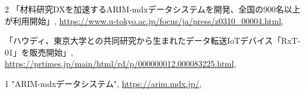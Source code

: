 \begin{発表}{2}
「材料研究DXを加速するARIM-mdxデータシステムを開発、全国の900名以上が利用開始」,
\url{https://www.u-tokyo.ac.jp/focus/ja/press/z0310_00004.html},

「ハウディ、東京大学との共同研究から生まれたデータ転送IoTデバイス「RxT-01」を販売開始」,
\url{https://prtimes.jp/main/html/rd/p/000000012.000083225.html},

\end{発表}

\begin{公開}{1}
"ARIM-mdxデータシステム",
\url{https://arim.mdx.jp/},
\end{公開}
